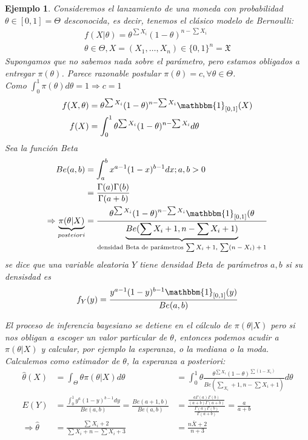 \documentclass[10pt]{article}
\theoremstyle{plain}
\newtheorem{ej}{Ejemplo}
\theoremstyle{definition}
\begin{document}
\begin{ej}
Consideremos el lanzamiento de una moneda con probabilidad $\theta \in [0,1] = \Theta$ desconocida, es decir, tenemos el clásico modelo de Bernoulli:
\begin{align*}
f(X|\theta) = \theta^{\sum X_{i}}(1-\theta)^{n-\sum X_{i}}\\
\theta\in \Theta, X = (X_{1},\ldots,X_{n}) \in \{0,1\}^n = \mathfrak{X}
\end{align*}
Supongamos que no sabemos nada sobre el parámetro, pero estamos obligados a entregar $\pi(\theta)$. Parece razonable postular $\pi(\theta)=c, \forall \theta\in\Theta$.\\
Como $\int_{0}^{1}\pi(\theta)d\theta = 1 \Rightarrow c = 1$
\begin{align*}
f(X,\theta) &= \theta^{\sum X_{i}} (1-\theta)^{n-\sum X_{i}} \mathbbm{1}_{[0,1]}(X)\\
f(X) &= \int_{0}^{1}\theta^{\sum X_{i}}(1-\theta)^{n- \sum X_{i}}d\theta
\end{align*}
Sea la función Beta
\begin{align*}
Be(a,b) &= \int_{a}^{b}x^{a-1}(1-x)^{b-1}dx; a,b>0\\
&= \frac{\Gamma(a)\Gamma(b)}{\Gamma(a+b)}\\
\Rightarrow \underbrace{\pi(\theta|X)}_{posteiori} &= \frac{\theta^{\sum X_{i}}(1-\theta)^{n-\sum X_{i}}\mathbbm{1}_{[0,1]}(\theta}{\underbrace{Be(\sum X_{i}+1, n-\sum X_{i}+1)}_{\text{densidad Beta de parámetros $\sum X_{i} + 1$, $\sum(n-X_{i})+1$}}}
\end{align*}
se dice que una variable aleatoria $Y$ tiene densidad Beta de parámetros $a,b$ si su densisdad es
\begin{align*}
f_{Y}(y) = \frac{y^{a-1}(1-y)^{b-1}\mathbbm{1}_{[0,1]}(y)}{Be(a,b)}
\end{align*}

El proceso de inferencia bayesiano se detiene en el cálculo de $\pi(\theta|X)$ pero si nos obligan a escoger un valor particular de $\theta$, entonces podemos acudir a $\pi(\theta|X)$ y calcular, por ejemplo la esperanza, o la mediana o la moda.\\
Calculemos como estimador de $\theta$, la esperanza a posteriori:
\begin{align*}
\hat{\theta}(X) &= \int_{\Theta}\theta\pi(\theta|X)d\theta &= \int_{0}^{1}\theta \frac{\theta^{\sum X_{i}}(1-\theta)^{\sum(1-X_{i})}}{Be(\sum_{X_{i}}+1,n-\sum X_{i}+1)}d\theta\\
E(Y) &= \frac{\int_{0}^{1}y^a(1-y)^{b-1}dy}{Be(a,b)} = \frac{Be(a+1,b)}{Be(a,b)} &= \frac{\frac{a\Gamma(a)\Gamma(b)}{(a+b)\Gamma(a+b)}}{\frac{\Gamma(a)\Gamma(b)}{\Gamma(a+b)}}= \frac{a}{a+b}\\
\Rightarrow \hat{\theta} &= \frac{\sum X_{i} + 2}{\sum X_{i} + n - \sum X_{i} + 3} &= \frac{n\bar{X}+2}{n+3}
\end{align*}
\end{ej}
\end{document}
